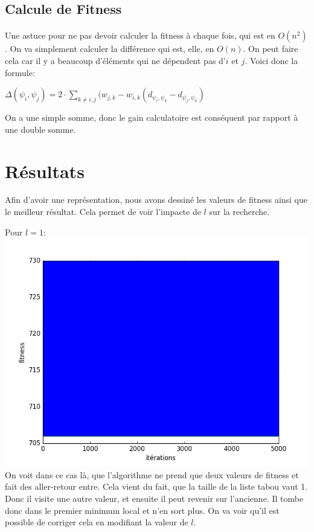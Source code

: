 \documentclass[a4paper, 11pt]{article}
\begin{document}
\subsection{Calcule de Fitness}
\paragraph{}
Une astuce pour ne pas devoir calculer la fitness à chaque fois, qui est en $O(n^2)$. On va simplement calculer la différence qui est, 
elle, en $O(n)$. On peut faire cela car il y a beaucoup d'éléments qui ne dépendent pas d'$i$ et $j$. Voici donc la formule:
\begin{center}
 $\Delta(\psi_i,\psi_j) = 2 \cdot \sum\limits_{k \ne i,j}(w_{j,k}-w_{i,k}(d_{\psi_i,\psi_k} - d_{\psi_j,\psi_k})$
\end{center}
On a une simple somme, donc le gain calculatoire est conséquent par rapport à une double somme.

\section{Résultats}
Afin d'avoir une représentation, nous avons dessiné les valeurs de fitness ainsi que le meilleur résultat. Cela permet de voir l'impacte
de $l$ sur la recherche.

Pour $l=1$:
\\
\includegraphics[scale=0.5]{l_1}
\\
On voit dans ce cas là, que l'algorithme ne prend que deux valeurs de fitness et fait des aller-retour entre.
Cela vient du fait, que la taille de la liste tabou vaut 1. Donc il visite une autre valeur, et ensuite il peut revenir sur l'ancienne.
Il tombe donc dans le premier minimum local et n'en sort plus.
On va voir qu'il est possible de corriger cela en modifiant la valeur de $l$.
\end{document}
